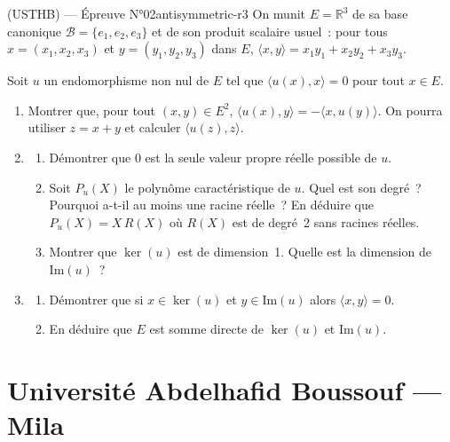 \newpage

\begin{problem}{(USTHB) — Épreuve N°02}{antisymmetric-r3}
On munit $E=\mathbb{R}^3$ de sa base canonique $\mathcal{B}=\{e_1,e_2,e_3\}$ et de son produit scalaire usuel~:
pour tous $x=(x_1,x_2,x_3)$ et $y=(y_1,y_2,y_3)$ dans $E$,
$\langle x,y\rangle = x_1 y_1 + x_2 y_2 + x_3 y_3$.

Soit $u$ un endomorphisme non nul de $E$ tel que
$\langle u(x),x\rangle=0$ pour tout $x\in E$.
\begin{enumerate}
  \item Montrer que, pour tout $(x,y)\in E^{2}$,
        $\langle u(x),y\rangle = -\langle x,u(y)\rangle$.
        On pourra utiliser $z=x+y$ et calculer $\langle u(z),z\rangle$.
  \item \begin{enumerate}
          \item Démontrer que $0$ est la seule valeur propre réelle possible de $u$.
          \item Soit $P_u(X)$ le polynôme caractéristique de $u$. Quel est son degré~?
                Pourquoi a-t-il au moins une racine réelle~? En déduire que
                $P_u(X)=X\,R(X)$ où $R(X)$ est de degré~2 sans racines réelles.
          \item Montrer que $\ker(u)$ est de dimension~1. Quelle est la dimension de $\mathrm{Im}(u)$~?
        \end{enumerate}
  \item \begin{enumerate}
          \item Démontrer que si $x\in\ker(u)$ et $y\in\mathrm{Im}(u)$ alors
                $\langle x,y\rangle=0$.
          \item En déduire que $E$ est somme directe de $\ker(u)$ et $\mathrm{Im}(u)$.
        \end{enumerate}
\end{enumerate}

\end{problem}

\newpage

\section{Université Abdelhafid Boussouf --- Mila}

